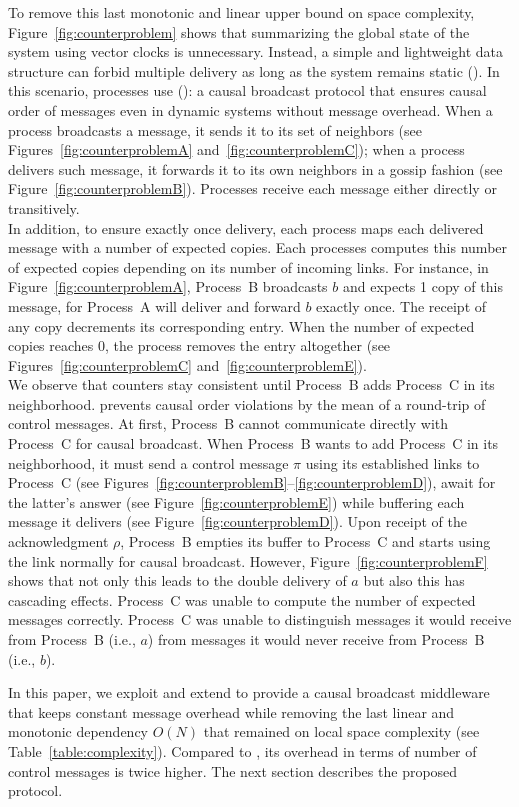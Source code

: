 To remove this last monotonic and linear upper bound on space complexity,
Figure~\ref{fig:counterproblem} shows that summarizing the global state of the
system using vector clocks is unnecessary. Instead, a simple and lightweight
data structure can forbid multiple delivery as long as the system remains static
(\REF). In this scenario, processes use \PCBROADCAST (\REF): a causal broadcast
protocol that ensures causal order of messages even in dynamic systems without
message overhead.  When a process broadcasts a message, it sends it to its set
of neighbors (see Figures~\ref{fig:counterproblemA}
and~\ref{fig:counterproblemC}); when a process delivers such message, it
forwards it to its own neighbors in a gossip fashion (see
Figure~\ref{fig:counterproblemB}). Processes receive each message either
directly or transitively.\\
In addition, to ensure exactly once delivery, each process maps each delivered
message with a number of expected copies. Each processes computes this number of
expected copies depending on its number of incoming links. For instance, in
Figure~\ref{fig:counterproblemA}, Process~B broadcasts $b$ and expects 1 copy of
this message, for Process~A will deliver and forward $b$ exactly once. The
receipt of any copy decrements its corresponding entry.  When the number of
expected copies reaches 0, the process removes the entry altogether (see
Figures~\ref{fig:counterproblemC} and~\ref{fig:counterproblemE}).\\ We observe
that counters stay consistent until Process~B adds Process~C in its
neighborhood. \PCBROADCAST prevents causal order violations by the mean of a
round-trip of control messages.  At first, Process~B cannot communicate directly
with Process~C for causal broadcast. When Process~B wants to add Process~C in
its neighborhood, it must send a control message $\pi$ using its established
links to Process~C (see
Figures~\ref{fig:counterproblemB}--\ref{fig:counterproblemD}), await for the
latter's answer (see Figure~\ref{fig:counterproblemE}) while buffering each
message it delivers (see Figure~\ref{fig:counterproblemD}). Upon receipt of the
acknowledgment $\rho$, Process~B empties its buffer to Process~C and starts
using the link normally for causal broadcast. However,
Figure~\ref{fig:counterproblemF} shows that not only this leads to the double
delivery of $a$ but also this has cascading effects. Process~C was unable to
compute the number of expected messages correctly. Process~C was unable to
distinguish messages it would receive from Process~B (i.e., $a$) from messages
it would never receive from Process~B (i.e., $b$).

In this paper, we exploit and extend \PCBROADCAST to provide a causal broadcast
middleware that keeps constant message overhead while removing the last linear
and monotonic dependency $O(N)$ that remained on local space complexity (see
Table~\ref{table:complexity}). Compared to \PCBROADCAST, its overhead in terms
of number of control messages is twice higher.  The next section describes the
proposed protocol.


